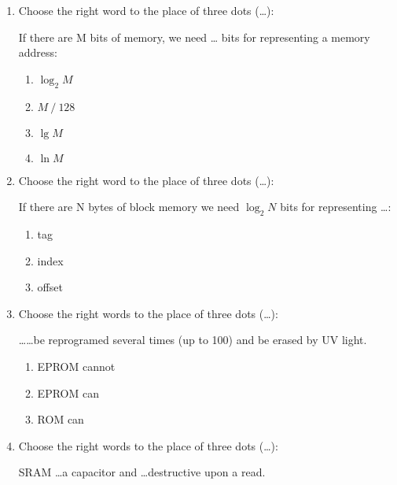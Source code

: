 \documentclass[paper=8.2in:11.6in]{scrartcl}
\begin{document}

\begin{enumerate}

\item Choose the right word to the place of three dots (\ldots):

If there are M bits of memory, we need … bits for representing a memory address:

\begin{enumerate}[label=\alph*)]

\item $\log_2 M$
\item $ M \  / \  128$
\item $\lg M$
\item $\ln M$ 

\end{enumerate}

\item Choose the right word to the place of three dots (\ldots):

If there are N bytes of block memory we need $\log_2 N$ bits for representing \ldots:

\begin{enumerate}[label=\alph*)]

\item tag
\item index
\item offset

\end{enumerate}

\item Choose the right words to the place of three dots (\ldots):

\ldots \ldots be reprogramed several times (up to 100) and be erased by UV light.

\begin{enumerate}[label=\alph*)]

\item EPROM cannot
\item EPROM can
\item ROM can

\end{enumerate}

\item Choose the right words to the place of three dots (\ldots):

SRAM \ldots a capacitor and \ldots destructive upon a read.

\begin{enumerate}[label=\alph*)]


\end{enumerate}
\end{enumerate}
\end{document}

